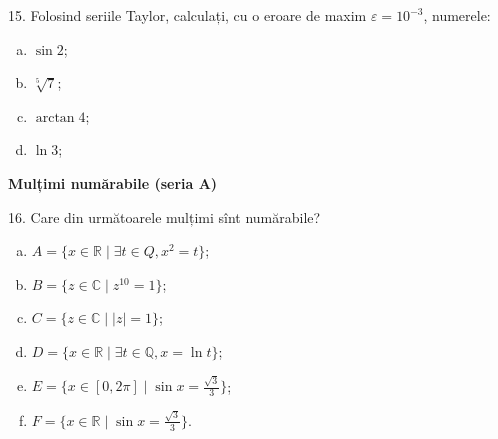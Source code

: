 \documentclass[11pt,a4paper]{article}
\newcommand\RR{\mathbb{R}}
\newcommand\QQ{\mathbb{Q}}
\newcommand\CC{\mathbb{C}}
\theoremstyle{dotless}
\theoremstyle{dotlessdr}
\begin{document}
\vspace{1cm}

15. Folosind seriile Taylor, calculați, cu o eroare de maxim $\varepsilon = 10^{-3}$,
numerele:
\begin{enumerate}[(a)]
\item $\sin 2$;
\item $\sqrt[5]{7}$;
\item $\arctan 4$;
\item $\ln 3$;
\end{enumerate}

\vspace{1cm}

\textbf{Mulțimi numărabile (seria A)}

16. Care din următoarele mulțimi sînt numărabile?
\begin{enumerate}[(a)]
\item $A = \{ x \in \RR \mid \exists t \in Q, x^2 = t \}$;
\item $B = \{ z \in \CC \mid z^{10} = 1 \}$;
\item $C = \{ z \in \CC \mid |z| = 1\}$;
\item $D = \{ x \in \RR \mid \exists t \in \QQ, x = \ln t\}$;
\item $E = \{ x \in [0, 2\pi] \mid \sin x = \frac{\sqrt{3}}{3} \}$;
\item $F = \{ x \in \RR \mid \sin x = \frac{\sqrt{3}}{3} \}$.
\end{enumerate}
\end{document}
